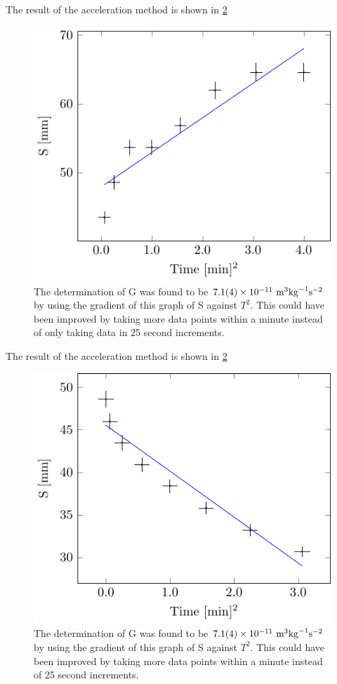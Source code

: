 \documentclass[12pt]{article}
\begin{document}
{The result of the acceleration method is shown in \cref{fig:acc}
\begin{figure}[H]
\centering
\includegraphics[scale=2.0]{graphs/linearB}
\caption{The determination of G was found to be  $7.1(4)\times{10^{-11}}{\rm \ m}^3 {\rm kg}^{-1} {\rm s}^{-2}$ by using the gradient of this graph of S against $T^{2}$. This could have been improved by taking more data points within a minute instead of only taking data in 25 second increments.}
\label{fig:acc}
\end{figure}


The result of the acceleration method is shown in \cref{fig:acc}
\begin{figure}[H]
\centering
\includegraphics[scale=2.0]{graphs/linearA}
\caption{The determination of G was found to be $7.1(4)\times{10^{-11}}{\rm \ m}^3 {\rm kg}^{-1} {\rm s}^{-2}$ by using the gradient of this graph of S against $T^{2}$. This could have been improved by taking more data points within a minute instead of 25 second increments.}
\label{fig:acc}
\end{figure}

}
\end{document}
